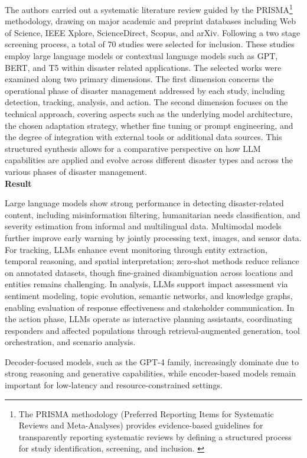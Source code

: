 The authors carried out a systematic literature review guided by the PRISMA\footnote{The PRISMA methodology (Preferred Reporting Items for Systematic Reviews and Meta-Analyses) provides evidence-based guidelines for transparently reporting systematic reviews by defining a structured process for study identification, screening, and inclusion.
\cite{page2021prisma} } methodology, drawing on major academic and preprint databases including Web of Science, IEEE Xplore, ScienceDirect, Scopus, and arXiv. Following a two stage screening process, a total of 70 studies were selected for inclusion. These studies employ large language models or contextual language models such as GPT, BERT, and T5 within disaster related applications.
The selected works were examined along two primary dimensions.
The first dimension concerns the operational phase of disaster management addressed by each study, including detection, tracking, analysis, and action.
The second dimension focuses on the technical approach, covering aspects such as the underlying model architecture, the chosen adaptation strategy, whether fine tuning or prompt engineering, and the degree of integration with external tools or additional data sources.
This structured synthesis allows for a comparative perspective on how LLM capabilities are applied and evolve across different disaster types and across the various phases of disaster management.
\\

\textbf{Result}

Large language models show strong performance in detecting disaster-related content, including misinformation filtering, humanitarian needs classification, and severity estimation from informal and multilingual data.
Multimodal models further improve early warning by jointly processing text, images, and sensor data.
For tracking, LLMs enhance event monitoring through entity extraction, temporal reasoning, and spatial interpretation; zero-shot methods reduce reliance on annotated datasets, though fine-grained disambiguation across locations and entities remains challenging.
In analysis, LLMs support impact assessment via sentiment modeling, topic evolution, semantic networks, and knowledge graphs, enabling evaluation of response effectiveness and stakeholder communication.
In the action phase, LLMs operate as interactive planning assistants, coordinating responders and affected populations through retrieval-augmented generation, tool orchestration, and scenario analysis.

Decoder-focused models, such as the GPT-4 family, increasingly dominate due to strong reasoning and generative capabilities, while encoder-based models remain important for low-latency and resource-constrained settings.

